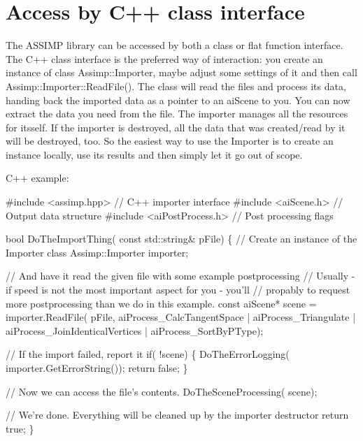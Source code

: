 \hypertarget{usage_access_cpp}{}\section{Access by C++ class interface}\label{usage_access_cpp}
The A\+S\+S\+I\+M\+P library can be accessed by both a class or flat function interface. The C++ class interface is the preferred way of interaction\+: you create an instance of class Assimp\+::\+Importer, maybe adjust some settings of it and then call Assimp\+::\+Importer\+::\+Read\+File(). The class will read the files and process its data, handing back the imported data as a pointer to an ai\+Scene to you. You can now extract the data you need from the file. The importer manages all the resources for itsself. If the importer is destroyed, all the data that was created/read by it will be destroyed, too. So the easiest way to use the Importer is to create an instance locally, use its results and then simply let it go out of scope.

C++ example\+: 
\begin{DoxyCode}
\textcolor{preprocessor}{#include <assimp.hpp>}      \textcolor{comment}{// C++ importer interface}
\textcolor{preprocessor}{#include <aiScene.h>}       \textcolor{comment}{// Output data structure}
\textcolor{preprocessor}{#include <aiPostProcess.h>} \textcolor{comment}{// Post processing flags}

\textcolor{keywordtype}{bool} DoTheImportThing( \textcolor{keyword}{const} std::string& pFile)
\{
  \textcolor{comment}{// Create an instance of the Importer class}
  Assimp::Importer importer;

  \textcolor{comment}{// And have it read the given file with some example postprocessing}
  \textcolor{comment}{// Usually - if speed is not the most important aspect for you - you'll }
  \textcolor{comment}{// propably to request more postprocessing than we do in this example.}
  \textcolor{keyword}{const} aiScene* scene = importer.ReadFile( pFile, 
    aiProcess\_CalcTangentSpace       | 
    aiProcess\_Triangulate            |
    aiProcess\_JoinIdenticalVertices  |
    aiProcess\_SortByPType);
  
  \textcolor{comment}{// If the import failed, report it}
  \textcolor{keywordflow}{if}( !scene)
  \{
    DoTheErrorLogging( importer.GetErrorString());
    \textcolor{keywordflow}{return} \textcolor{keyword}{false};
  \}

  \textcolor{comment}{// Now we can access the file's contents. }
  DoTheSceneProcessing( scene);

  \textcolor{comment}{// We're done. Everything will be cleaned up by the importer destructor}
  \textcolor{keywordflow}{return} \textcolor{keyword}{true};
\}
\end{DoxyCode}


